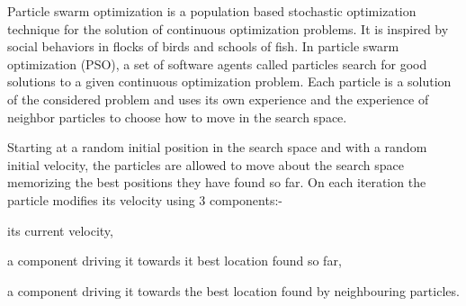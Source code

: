 

Particle swarm optimization \citep{kennedy95particle} is a population based stochastic optimization technique for the solution of continuous optimization problems. It is inspired by social behaviors in flocks of birds and schools of fish. In particle swarm optimization (PSO), a set of software agents called particles search for good solutions to a given continuous optimization problem. Each particle is a solution of the considered problem and uses its own experience and the experience of neighbor particles to choose how to move in the search space. 

Starting at a random initial position in the search space and with a random initial velocity, the particles are allowed to move about the search space memorizing the best positions they have found so far. On each iteration the particle modifies its velocity using 3 components:-  \begin{inparaenum} \item its current velocity, \item a component driving it towards it best location found so far, \item a component driving it towards the best location found by neighbouring particles.\end{inparaenum}



